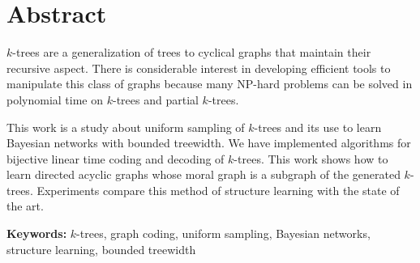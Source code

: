 \chapter*{Abstract}

$k$-trees are a generalization of trees to cyclical graphs that maintain their recursive aspect. There is considerable interest in developing efficient tools to manipulate this class of graphs because many NP-hard problems can be solved in polynomial time on $k$-trees and partial $k$-trees.

\vspace{1em}

\noindent This work is a study about uniform sampling of $k$-trees and its use to learn Bayesian networks with bounded treewidth. We have implemented algorithms for bijective linear time coding and decoding of $k$-trees. This work shows how to learn directed acyclic graphs whose moral graph is a subgraph of the generated $k$-trees. Experiments compare this method of structure learning with the state of the art.

\vspace{1em}

\noindent \textbf{Keywords:} $k$-trees, graph coding, uniform sampling, Bayesian networks, structure learning, bounded treewidth
